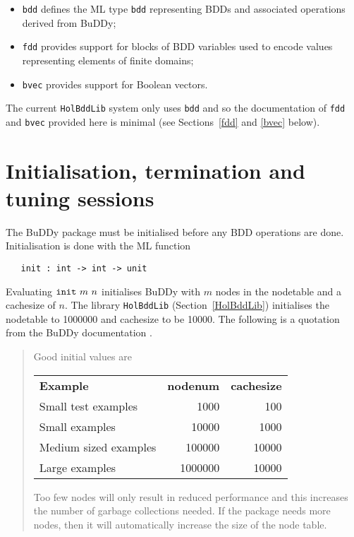 \documentclass[12pt]{article}
\newcommand{\bnind}[1]{\index[MLbn]{#1}}
\renewcommand{\t}[1]{\mbox{\tt #1}}
\newcommand{\ml}[1]{{\tt #1}}
\newcommand{\Buddy}{BuDDy\xspace}
\newcommand\HolBuddy{\texttt{HolBddLib}\xspace}
\begin{document}
\begin{itemize}

\item \t{bdd} defines the ML type
\t{bdd} representing BDDs and associated operations derived from \Buddy;


\item \t{fdd} provides support for blocks of BDD variables
used to encode values representing elements of finite domains;

\item \t{bvec} provides support for Boolean vectors.

\end{itemize}

The current \HolBuddy{} system only uses \t{bdd} and so
the documentation of \t{fdd} and \t{bvec} provided here is minimal
(see Sections~\ref{fdd} and \ref{bvec} below).

\section{Initialisation, termination and tuning sessions}\label{init}

The \Buddy{} package must be initialised before any BDD operations are done.
Initialisation is done with the ML function

\begin{verbatim}
   init : int -> int -> unit
\end{verbatim}\bnind{\ml{init}}

Evaluating $\t{init}~m~n$ initialises \Buddy{} with $m$ nodes in the
nodetable and a cachesize of $n$.  
The library \t{HolBddLib} (Section~\ref{HolBddLib}) 
initialises the nodetable to 1000000 and cachesize to
be 10000. The following is a quotation from the \Buddy{} documentation \cite{BuDDy}.

\vspace*{-2mm}

{\baselineskip8pt\begin{quote}\footnotesize
Good initial values are

\smallskip

\begin{tabular}{lrr}
{\bf Example} & {\bf nodenum} & {\bf cachesize} \\
Small test examples   & 1000    & 100\\
Small examples        & 10000   & 1000 \\
Medium sized examples & 100000  & 10000\\
Large examples        & 1000000 & 10000
\end{tabular}

\smallskip

Too few nodes will only result in reduced performance and this
increases the number of garbage collections needed. If the package
needs more nodes, then it will automatically increase the size of the
node table.
\end{quote}}
\end{document}
